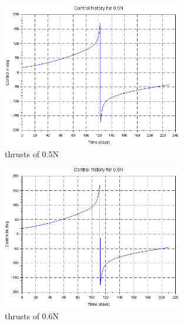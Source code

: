 \documentclass{article}
\begin{document}
	\begin{figure}[htbp]
		\centering
		\includegraphics[width=0.7\textwidth]{figure4.png}
		\caption{thrusts of 0.5N}
		\label{fig:0.5}
	\end{figure}
	
	\begin{figure}[htbp]
		\centering
		\includegraphics[width=0.7\textwidth]{figure5.png}
		\caption{thrusts of 0.6N}
		\label{fig:0.6}
	\end{figure}
	
	
\end{document}
